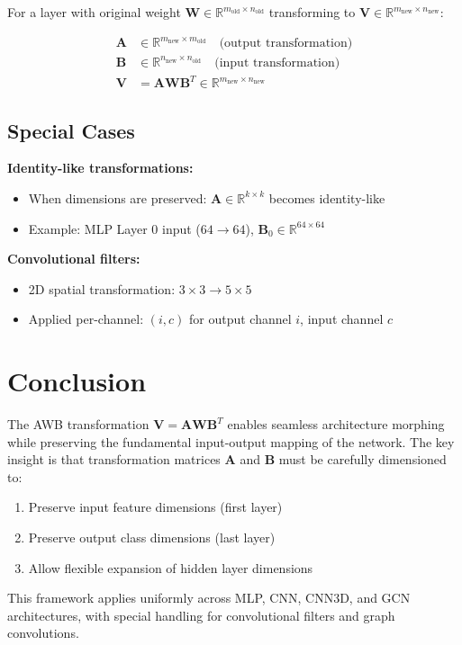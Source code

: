 \documentclass[11pt]{article}
\begin{document}
For a layer with original weight $\mathbf{W} \in \mathbb{R}^{m_{\text{old}} \times n_{\text{old}}}$ transforming to $\mathbf{V} \in \mathbb{R}^{m_{\text{new}} \times n_{\text{new}}}$:

\begin{align}
\mathbf{A} &\in \mathbb{R}^{m_{\text{new}} \times m_{\text{old}}} \quad \text{(output transformation)} \\
\mathbf{B} &\in \mathbb{R}^{n_{\text{new}} \times n_{\text{old}}} \quad \text{(input transformation)} \\
\mathbf{V} &= \mathbf{A} \mathbf{W} \mathbf{B}^T \in \mathbb{R}^{m_{\text{new}} \times n_{\text{new}}}
\end{align}

\subsection{Special Cases}

\textbf{Identity-like transformations:}
\begin{itemize}
    \item When dimensions are preserved: $\mathbf{A} \in \mathbb{R}^{k \times k}$ becomes identity-like
    \item Example: MLP Layer 0 input ($64 \rightarrow 64$), $\mathbf{B}_0 \in \mathbb{R}^{64 \times 64}$
\end{itemize}

\textbf{Convolutional filters:}
\begin{itemize}
    \item 2D spatial transformation: $3 \times 3 \rightarrow 5 \times 5$
    \item Applied per-channel: $(i, c)$ for output channel $i$, input channel $c$
\end{itemize}

\section{Conclusion}

The AWB transformation $\mathbf{V} = \mathbf{A} \mathbf{W} \mathbf{B}^T$ enables seamless architecture morphing while preserving the fundamental input-output mapping of the network. The key insight is that transformation matrices $\mathbf{A}$ and $\mathbf{B}$ must be carefully dimensioned to:
\begin{enumerate}
    \item Preserve input feature dimensions (first layer)
    \item Preserve output class dimensions (last layer)
    \item Allow flexible expansion of hidden layer dimensions
\end{enumerate}

This framework applies uniformly across MLP, CNN, CNN3D, and GCN architectures, with special handling for convolutional filters and graph convolutions.
\end{document}
